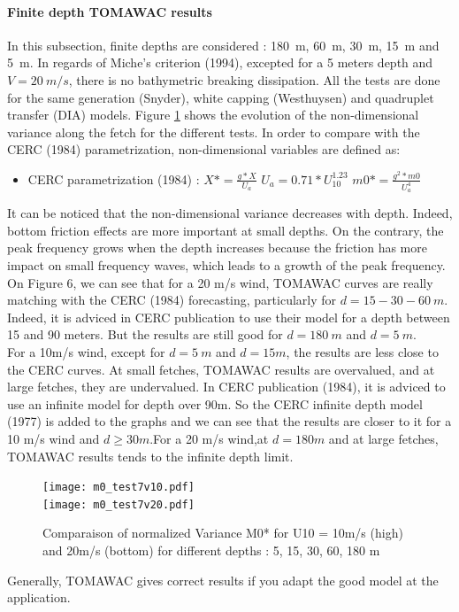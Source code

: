 \paragraph{Finite depth TOMAWAC results}
In this subsection, finite depths are considered : 180~m, 60~m, 30~m, 15~m and 5~m. In regards of Miche's criterion (1994), excepted for a 5 meters depth and $V = 20~m/s$, there is no bathymetric breaking dissipation. All the tests are done for the same generation (Snyder), white capping (Westhuysen) and quadruplet transfer (DIA) models. Figure \ref{variancem0} shows the evolution of the non-dimensional variance along the fetch for the different tests. In order to compare with the CERC (1984) parametrization, non-dimensional variables are defined as:\\
\begin{itemize}
\item CERC parametrization (1984) :
\subitem $X* = \frac{g*X}{U_a}$
\subitem $U_a = 0.71*U_{10}^{1.23}$
\subitem $m0* = \frac{g^2*m0}{U_a^4}$
\end{itemize}
It can be noticed that the non-dimensional variance decreases with depth. Indeed, bottom friction effects are more important at small depths. On the contrary, the peak frequency grows when the depth increases because the friction has more impact on small frequency waves, which leads to a growth of the peak frequency.\\
On Figure 6, we can see that for a 20 m/s wind, TOMAWAC curves are really matching with the CERC (1984) forecasting, particularly for $d = 15 - 30 - 60~m$. Indeed, it is adviced in CERC publication to use their model for a depth between 15 and 90 meters. But the results are still good for $d = 180~m$ and $d = 5~m$.\\
For a 10m/s wind, except for $d = 5~m $ and $d = 15 m$, the results are less close to the CERC curves. At small fetches, TOMAWAC results are overvalued, and at large fetches, they are undervalued. In CERC publication (1984), it is adviced to use an infinite model for depth over 90m. So the CERC infinite depth model (1977) is added to the graphs and we can see that the results are closer to it for a 10 m/s wind and $d \geq 30m$.For a 20 m/s wind,at $d = 180m$ and at large fetches, TOMAWAC results tends to the infinite depth limit.
\begin{figure}
\centering
\texttt{[image: m0\_test7v10.pdf]}\\
\texttt{[image: m0\_test7v20.pdf]}\\
\caption{Comparaison of normalized Variance M0* for U10 = 10m/s (high) and 20m/s (bottom) for different depths : 5, 15, 30, 60, 180 m}
\label{variancem0}
\end{figure}
Generally, TOMAWAC gives correct results if you adapt the good model at the application.
